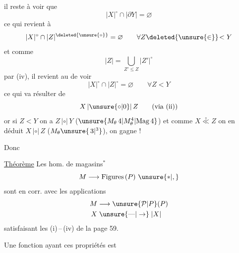 
il reste à voir que
\[
 |X|^\circ\cap|\partial Y|=\varnothing
\]
ce qui revient à
\[
 |X|^\circ\cap|Z|^{\deleted{\unsure{\circ}}}=\varnothing\qquad \forall Z\deleted{\unsure{\in}}\!<Y
\]
  et comme
\[
 |Z|=\bigcup_{Z'\leq Z}|Z'|^\circ
\]
par (iv), il revient au  de voir
\[
 |X|^\circ\cap|Z|^\circ=\varnothing\qquad\forall Z<Y
\]
ce qui va résulter de
\[
 X\,|\unsure{\circ|0}|\,Z\qquad\text{(via (ii))}
\]
or si $Z<Y$ on a $Z\,|\circ|\,Y$ ($\unsure{M_\theta\,4|M_\theta^{4}|\mathrm{Mag}\,4}$) et comme $X\mathrel{\overset{\circ}{\ll}}Z$ on en déduit $X\,|\circ|\,Z$ ($M_\theta\unsure{\,3|{}^{3}}$), on gagne !

Donc

\uline{Théorème} Les hom. de magasins$^{*}$
\[
 M\longrightarrow\mathrm{Figures}\,(P)\ \unsure{*|,}
\]
sont en corr.  avec les applications
\[
 \begin{aligned}
 M&\longrightarrow \unsure{\mathcal P|P}(P)\\
 X&\mathrel{\unsure{\text{---}|\to}}|X|
 \end{aligned}
\]
satisfaisant  les   (i)\,--\,(iv) de la page 59.

Une fonction ayant ces propriétés est
